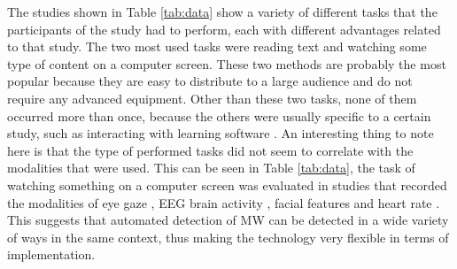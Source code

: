 The studies shown in Table \ref{tab:data} show a variety of different tasks that the participants of the study had to perform, each with different advantages related to that study. The two most used tasks were reading text and watching some type of content on a computer screen. These two methods are probably the most popular because they are easy to distribute to a large audience and do not require any advanced equipment. Other than these two tasks, none of them occurred more than once, because the others were usually specific to a certain study, such as interacting with learning software \cite{Hutt2017OutClassroom}. An interesting thing to note here is that the type of performed tasks did not seem to correlate with the modalities that were used. This can be seen in Table \ref{tab:data}, the task of watching something on a computer screen was evaluated in studies that recorded the modalities of eye gaze \cite{Zhao2017ScalableApproach}, EEG brain activity \cite{Russell2016MonitoringEnvironments}, facial features \cite{Stewart2017FaceComprehension} and heart rate \cite{Pham2015Attentivelearner:Tracking}. This suggests that automated detection of MW can be detected in a wide variety of ways in the same context, thus making the technology very flexible in terms of implementation.